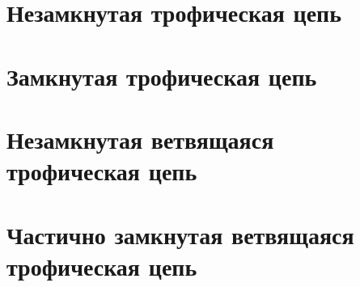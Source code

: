 \documentclass[
    14pt, 
    a4paper, 
    titlepage, 
    fleqn
]{extarticle}
\begin{document}
    
    
    \tableofcontents

    \pagebreak

    
    
    \pagebreak
    
    

    \pagebreak

    

    \pagebreak

    \section{Незамкнутая трофическая цепь}
    

    \pagebreak

    

    \pagebreak

    \section{Замкнутая трофическая цепь}
    


    
    \pagebreak

    \section{Незамкнутая ветвящаяся трофическая цепь}
    
    \pagebreak

    \section{Частично замкнутая ветвящаяся трофическая цепь}

    \pagebreak

    

    \pagebreak

    
\end{document}
